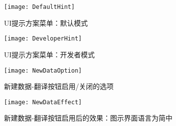 \documentclass{../../PublicResources/DocClass}
\begin{document}
    \begin{figure}[htbp]
        \begin{minipage}[t]{0.45\textwidth}
            \texttt{[image: DefaultHint]}
            \caption{UI提示方案菜单：默认模式}
            \label{UI提示方案菜单：默认模式}
        \end{minipage}
        \qquad
        \begin{minipage}[t]{0.45\textwidth}
            \texttt{[image: DeveloperHint]}
            \caption{UI提示方案菜单：开发者模式}
            \label{UI提示方案菜单：开发者模式}
        \end{minipage}

        \vspace{1ex}

        \begin{minipage}[t]{0.38\textwidth}
            \texttt{[image: NewDataOption]}
            \caption{新建数据-翻译按钮启用/关闭的选项}
            \label{新建数据选项}
        \end{minipage}
        \begin{minipage}[t]{0.65\textwidth}
            \texttt{[image: NewDataEffect]}
            \caption{新建数据-翻译按钮启用后的效果：图示界面语言为简中}
            \label{新建数据效果}
        \end{minipage}
    \end{figure}
\end{document}
